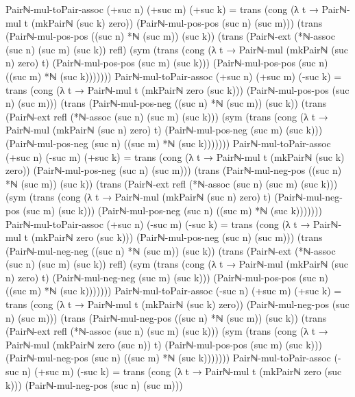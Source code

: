 \documentclass[11pt,a4paper]{book}
\begin{document}
\begin{code}
Pairℕ-mul-toPair-assoc (+suc n) (+suc m) (+suc k) =
  trans
    (cong (λ t → Pairℕ-mul t (mkPairℕ (suc k) zero)) (Pairℕ-mul-pos-pos (suc n) (suc m)))
    (trans
      (Pairℕ-mul-pos-pos ((suc n) *ℕ (suc m)) (suc k))
      (trans
        (Pairℕ-ext (*ℕ-assoc (suc n) (suc m) (suc k)) refl)
        (sym
          (trans
            (cong (λ t → Pairℕ-mul (mkPairℕ (suc n) zero) t) (Pairℕ-mul-pos-pos (suc m) (suc k)))
            (Pairℕ-mul-pos-pos (suc n) ((suc m) *ℕ (suc k)))))))
Pairℕ-mul-toPair-assoc (+suc n) (+suc m) (-suc k) =
  trans
    (cong (λ t → Pairℕ-mul t (mkPairℕ zero (suc k))) (Pairℕ-mul-pos-pos (suc n) (suc m)))
    (trans
      (Pairℕ-mul-pos-neg ((suc n) *ℕ (suc m)) (suc k))
      (trans
        (Pairℕ-ext refl (*ℕ-assoc (suc n) (suc m) (suc k)))
        (sym
          (trans
            (cong (λ t → Pairℕ-mul (mkPairℕ (suc n) zero) t) (Pairℕ-mul-pos-neg (suc m) (suc k)))
            (Pairℕ-mul-pos-neg (suc n) ((suc m) *ℕ (suc k)))))))
Pairℕ-mul-toPair-assoc (+suc n) (-suc m) (+suc k) =
  trans
    (cong (λ t → Pairℕ-mul t (mkPairℕ (suc k) zero)) (Pairℕ-mul-pos-neg (suc n) (suc m)))
    (trans
      (Pairℕ-mul-neg-pos ((suc n) *ℕ (suc m)) (suc k))
      (trans
        (Pairℕ-ext refl (*ℕ-assoc (suc n) (suc m) (suc k)))
        (sym
          (trans
            (cong (λ t → Pairℕ-mul (mkPairℕ (suc n) zero) t) (Pairℕ-mul-neg-pos (suc m) (suc k)))
            (Pairℕ-mul-pos-neg (suc n) ((suc m) *ℕ (suc k)))))))
Pairℕ-mul-toPair-assoc (+suc n) (-suc m) (-suc k) =
  trans
    (cong (λ t → Pairℕ-mul t (mkPairℕ zero (suc k))) (Pairℕ-mul-pos-neg (suc n) (suc m)))
    (trans
      (Pairℕ-mul-neg-neg ((suc n) *ℕ (suc m)) (suc k))
      (trans
        (Pairℕ-ext (*ℕ-assoc (suc n) (suc m) (suc k)) refl)
        (sym
          (trans
            (cong (λ t → Pairℕ-mul (mkPairℕ (suc n) zero) t) (Pairℕ-mul-neg-neg (suc m) (suc k)))
            (Pairℕ-mul-pos-pos (suc n) ((suc m) *ℕ (suc k)))))))
Pairℕ-mul-toPair-assoc (-suc n) (+suc m) (+suc k) =
  trans
    (cong (λ t → Pairℕ-mul t (mkPairℕ (suc k) zero)) (Pairℕ-mul-neg-pos (suc n) (suc m)))
    (trans
      (Pairℕ-mul-neg-pos ((suc n) *ℕ (suc m)) (suc k))
      (trans
        (Pairℕ-ext refl (*ℕ-assoc (suc n) (suc m) (suc k)))
        (sym
          (trans
            (cong (λ t → Pairℕ-mul (mkPairℕ zero (suc n)) t) (Pairℕ-mul-pos-pos (suc m) (suc k)))
            (Pairℕ-mul-neg-pos (suc n) ((suc m) *ℕ (suc k)))))))
Pairℕ-mul-toPair-assoc (-suc n) (+suc m) (-suc k) =
  trans
    (cong (λ t → Pairℕ-mul t (mkPairℕ zero (suc k))) (Pairℕ-mul-neg-pos (suc n) (suc m)))

\end{code}
\end{document}

